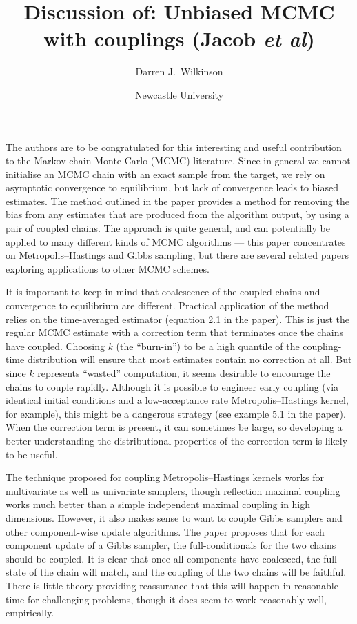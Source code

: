 \documentclass[11pt,a4paper]{article}
\title{Discussion of: Unbiased MCMC with couplings (Jacob \emph{et al})}
\author{Darren J.\ Wilkinson}
\date{Newcastle University}
\begin{document}
\maketitle

The authors are to be congratulated for this interesting and useful contribution to the Markov chain Monte Carlo (MCMC) literature. Since in general we cannot initialise an MCMC chain with an exact sample from the target, we rely on asymptotic convergence to equilibrium, but lack of convergence leads to biased estimates.
The method outlined in the paper provides a method for removing the bias from any estimates that are produced from the algorithm output, by using a pair of coupled chains.
The approach is quite general, and can potentially be applied to many different kinds of MCMC algorithms --- this paper concentrates on Metropolis--Hastings and Gibbs sampling, but there are several related papers exploring applications to other MCMC schemes. 

It is important to keep in mind that coalescence of the coupled chains and convergence to equilibrium are different. Practical application of the method relies on the
time-averaged estimator (equation 2.1 in the paper).
This is just the regular MCMC estimate with a correction term that terminates once the chains have coupled. Choosing $k$ (the ``burn-in'') to be a high quantile of the coupling-time distribution will ensure that most estimates contain no correction at all. But since $k$ represents ``wasted'' computation, it seems desirable to encourage the chains to couple rapidly. Although it is possible to engineer early coupling (via identical initial conditions and a low-acceptance rate Metropolis--Hastings kernel, for example), this might be a dangerous strategy (see example 5.1 in the paper). When the correction term is present, it can sometimes be large, so developing a better understanding the distributional properties of the correction term is likely to be useful.

The technique proposed for coupling Metropolis--Hastings kernels works for multivariate as well as univariate samplers, though reflection maximal coupling works much better than a simple independent maximal coupling in high dimensions. However, it also makes sense to want to couple Gibbs samplers and other component-wise update algorithms. The paper proposes that for each component update of a Gibbs sampler, the full-conditionals for the two chains should be coupled. It is clear that once all components have coalesced, the full state of the chain will match, and the coupling of the two chains will be faithful. There is little theory providing reassurance that this will happen in reasonable time for challenging problems, though it does seem to work reasonably well, empirically.
  
\end{document}
